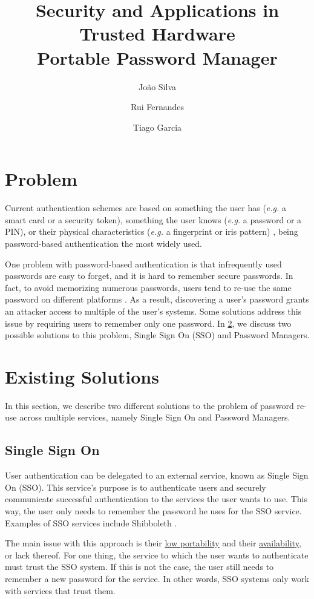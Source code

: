 \documentclass[a4paper, 11pt]{article}
\title{Security and Applications in Trusted Hardware \\ [0.8em] \smaller Portable Password Manager}
\author{João Silva \and Rui Fernandes \and Tiago Garcia}
\date{}
\begin{document}
\maketitle

\section{Problem}

Current authentication schemes are based on something the user has (\textit{e.g.} a smart card or a 
security token), something the user knows (\textit{e.g.} a password or a PIN), or their physical 
characteristics (\textit{e.g.} a fingerprint or iris pattern) \cite{1246384}, being password-based 
authentication the most widely used.


One problem with password-based authentication is that infrequently used passwords are easy to 
forget, and it is hard to remember secure passwords. In fact, to avoid memorizing numerous 
passwords, users tend to re-use the same password on different platforms \cite{florencio2006a}. As 
a result, discovering a user's password grants an attacker access to multiple of the user's 
systems. Some solutions address this issue by requiring users to remember only one password. In 
\cref{sec:solutions}, we discuss two possible solutions to this problem, Single Sign On (SSO) and 
Password Managers.

\section{Existing Solutions} \label{sec:solutions}

In this section, we describe two different solutions to the problem of password re-use across 
multiple services, namely Single Sign On and Password Managers.

\subsection{Single Sign On}

User authentication can be delegated to an external service, known as Single Sign On (SSO). This 
service's purpose is to authenticate users and securely communicate successful authentication to 
the services the user wants to use. This way, the user only needs to remember the password he uses 
for the SSO service. Examples of SSO services include Shibboleth 
\cite{10.1007/978-3-642-37282-7_14}.

The main issue with this approach is their \uline{low portability} and their \uline{availability}, 
or lack thereof. For one thing, the service to which the user wants to authenticate must trust the 
SSO system. If this is not the case, the user still needs to remember a new password for the 
service. In other words, SSO systems only work with services that trust them.
\end{document}
